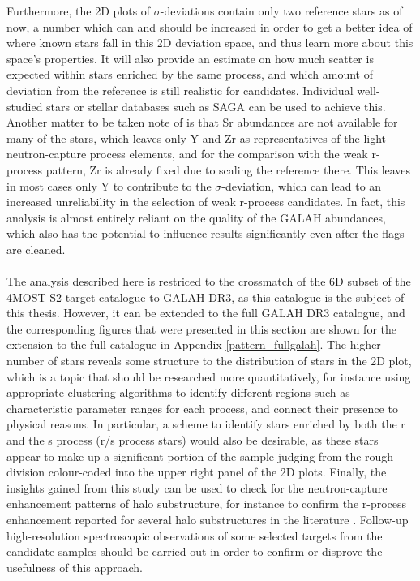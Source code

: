 \documentclass[a4paper,11pt]{article}
\begin{document}
%
Furthermore, the 2D plots of $\sigma$-deviations contain only two reference stars as of now, a number which can and should be increased in order to get a better idea of where known stars fall in this 2D deviation space, and thus learn more about this space's properties. It will also provide an estimate on how much scatter is expected within stars enriched by the same process, and which amount of deviation from the reference is still realistic for candidates. Individual well-studied stars or stellar databases such as SAGA can be used to achieve this. Another matter to be taken note of is that Sr abundances are not available for many of the stars, which leaves only Y and Zr as representatives of the light neutron-capture process elements, and for the comparison with the weak r-process pattern, Zr is already fixed due to scaling the reference there. This leaves in most cases only Y to contribute to the $\sigma$-deviation, which can lead to an increased unreliability in the selection of weak r-process candidates. In fact, this analysis is almost entirely reliant on the quality of the GALAH abundances, which also has the potential to influence results significantly even after the flags are cleaned.\\ \\
%
The analysis described here is restriced to the crossmatch of the 6D subset of the 4MOST S2 target catalogue to GALAH DR3, as this catalogue is the subject of this thesis. However, it can be extended to the full GALAH DR3 catalogue, and the corresponding figures that were presented in this section are shown for the extension to the full catalogue in Appendix \ref{pattern_fullgalah}. The higher number of stars reveals some structure to the distribution of stars in the 2D plot, which is a topic that should be researched more quantitatively, for instance using appropriate clustering algorithms to identify different regions such as characteristic parameter ranges for each process, and connect their presence to physical reasons. In particular, a scheme to identify stars enriched by both the r and the s process (r/s process stars) would also be desirable, as these stars appear to make up a significant portion of the sample judging from the rough division colour-coded into the upper right panel of the 2D plots. Finally, the insights gained from this study can be used to check for the neutron-capture enhancement patterns of halo substructure, for instance to confirm the r-process enhancement reported for several halo substructures in the literature \citep{matsuno21,aguado21,roederer18}. Follow-up high-resolution spectroscopic observations of some selected targets from the candidate samples should be carried out in order to confirm or disprove the usefulness of this approach.
%
%
%
%
%
\clearpage
\end{document}
